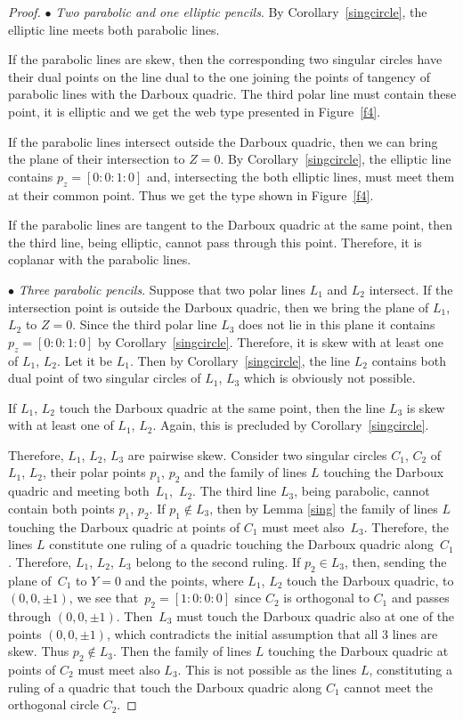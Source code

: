 \documentclass[pdftex]{sigma}
\numberwithin{equation}{section}
\begin{document}
\begin{proof}
$\bullet$ {\it Two parabolic and one elliptic pencils}.
By Corollary~\ref{singcircle}, the elliptic line meets both parabolic lines.

If the parabolic lines are skew, then the corresponding two singular circles have their dual points on the line dual to the one joining the points of tangency of parabolic lines with the Darboux quadric. The third polar line must contain these point, it is elliptic and we get
the web type presented in Figure~\ref{f4}.

If the parabolic lines intersect outside the Darboux quadric, then we can bring the plane of their intersection to $Z=0$. By Corollary~\ref{singcircle}, the elliptic line contains $p_z=[0:0:1:0]$ and, intersecting the both elliptic lines, must meet them at their common point. Thus we get the type shown in Figure~\ref{f4}.

If the parabolic lines are tangent to the Darboux quadric at the same point, then the third line, being elliptic, cannot pass through this point. Therefore, it is coplanar with the parabolic lines.

 $\bullet$ {\it Three parabolic pencils}.
Suppose that two polar lines $L_1$ and $L_2$ intersect. If the intersection point is outside the Darboux quadric, then we bring the plane of $L_1$, $L_2$ to $Z=0$. Since the third polar line $L_3$ does not lie in this plane it contains $p_z=[0:0:1:0]$ by Corollary~\ref{singcircle}. Therefore, it is skew with at least one of $L_1$, $L_2$. Let it be $L_1$. Then by Corollary~\ref{singcircle}, the line $L_2$ contains both dual point of two singular circles of $L_1$, $L_3$ which is obviously not possible.

If $L_1$, $L_2$ touch the Darboux quadric at the same point, then the line $L_3$ is skew with at least one of $L_1$, $L_2$. Again, this is precluded by Corollary~\ref{singcircle}.

Therefore, $L_1$, $L_2$, $L_3$ are pairwise skew. Consider two singular circles $C_1$, $C_2$ of $L_1$, $L_2$, their polar points $p_1$, $p_2$ and the family of lines $L$ touching the Darboux quadric and meeting both~$L_1$,~$L_2$. The third line $L_3$, being parabolic, cannot contain both points $p_1$, $p_2$. If $p_1 \notin L_3$, then by Lemma \ref{sing} the family of lines $L$ touching the Darboux quadric at points of $C_1$ must meet also~$L_3$. Therefore, the lines $L$ constitute one ruling of a quadric touching the Darboux quadric along~$C_1$. Therefore, $L_1$, $L_2$, $L_3$ belong to the second ruling. If $p_2\in L_3$, then, sending the plane of~$C_1$ to $Y=0$ and the points, where $L_1$, $L_2$ touch the Darboux quadric, to $(0,0,\pm 1)$, we see that~${p_2=[1:0:0:0]}$ since $C_2$ is orthogonal to $C_1$ and passes through $(0,0,\pm 1)$. Then~$L_3$ must touch the Darboux quadric also at one of the points $(0,0,\pm 1)$, which contradicts the initial assumption that all 3 lines are skew. Thus $p_2\notin L_3$. Then the family of lines $L$ touching the Darboux quadric at points of $C_2$ must meet also $L_3$. This is not possible as the lines $L$, constituting a ruling of a quadric that touch the Darboux quadric along $C_1$ cannot meet the orthogonal circle $C_2$.
\end{proof}
\end{document}

